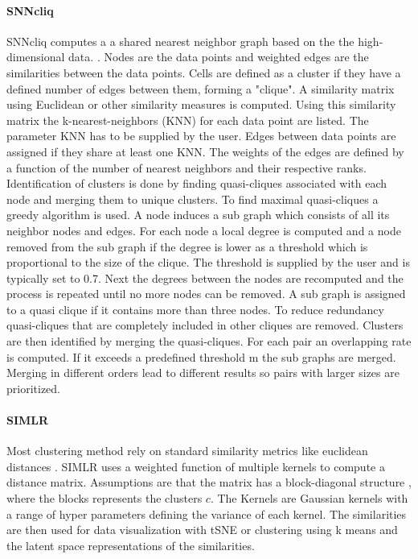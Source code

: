 \documentclass[11pt, a4paper]{article}\usepackage[]{graphicx}\usepackage[]{color}
\begin{document}
\paragraph{SNNcliq}
SNNcliq  computes a a shared nearest neighbor graph based on the the high-dimensional data. \citep{xu2015identification}. Nodes are the data points and weighted edges are the similarities between the data points. Cells are defined as a cluster if they have a defined number of edges between them, forming a "clique". 
A similarity matrix using Euclidean or other similarity measures is computed. Using this similarity matrix the  k-nearest-neighbors (KNN) for each data point are listed. The parameter KNN has to be supplied by the user. Edges between data points are assigned if they share at least one KNN. The weights of the edges are defined by a function of the number of nearest neighbors and their respective ranks. 
Identification of clusters is done by finding quasi-cliques associated with each node and merging them to unique clusters.
To find maximal quasi-cliques a greedy algorithm is used. A node induces a sub graph  which consists of all its neighbor nodes and edges. For each node a local degree is computed and a node removed from the sub graph if the degree is lower as a threshold which is proportional to the size of the clique. The threshold is supplied by the user and is typically set to 0.7. Next the degrees between the nodes are recomputed and the process is repeated until no more nodes can be removed. A sub graph  is assigned to a quasi clique if it contains more than three nodes. To reduce redundancy quasi-cliques that are completely included in other cliques are removed.
Clusters are then identified by merging the quasi-cliques. For each pair an overlapping rate is computed. If it exceeds a predefined threshold m the sub graphs are merged. Merging in different orders lead to different results so pairs with larger sizes are prioritized.

\paragraph{SIMLR}
Most clustering method rely on standard similarity metrics like euclidean distances \citep{wang2017visualization}. SIMLR uses a weighted function of multiple kernels to compute a distance matrix. Assumptions are that the matrix has a block-diagonal structure , where the blocks represents the clusters $c$. The Kernels are Gaussian kernels with a range of hyper parameters defining the variance of each kernel. The similarities are then used for data visualization with tSNE or clustering using k means and the latent space representations of the similarities.
\end{document}
